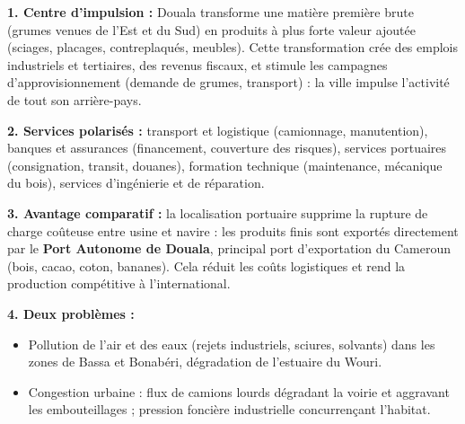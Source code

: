 \documentclass[11pt]{article}
\newcommand{\cle}[1]{{\popxbold\color{popdark}#1}}
\begin{document}
\begin{corrige}
\textbf{1. Centre d'impulsion :} Douala transforme une matière première brute (grumes venues de l'Est et du Sud) en produits à plus forte \cle{valeur ajoutée} (sciages, placages, contreplaqués, meubles). Cette transformation crée des emplois industriels et tertiaires, des revenus fiscaux, et stimule les campagnes d'approvisionnement (demande de grumes, transport) : la ville impulse l'activité de tout son arrière-pays.

\textbf{2. Services polarisés :} transport et logistique (camionnage, manutention), banques et assurances (financement, couverture des risques), services portuaires (consignation, transit, douanes), formation technique (maintenance, mécanique du bois), services d'ingénierie et de réparation.

\textbf{3. Avantage comparatif :} la localisation portuaire supprime la rupture de charge coûteuse entre usine et navire : les produits finis sont exportés directement par le \textbf{Port Autonome de Douala}, principal port d'exportation du Cameroun (bois, cacao, coton, bananes). Cela réduit les coûts logistiques et rend la production compétitive à l'international.

\textbf{4. Deux problèmes :}
\begin{itemize}
    \item Pollution de l'air et des eaux (rejets industriels, sciures, solvants) dans les zones de Bassa et Bonabéri, dégradation de l'estuaire du Wouri.
    \item Congestion urbaine : flux de camions lourds dégradant la voirie et aggravant les embouteillages ; pression foncière industrielle concurrençant l'habitat.
\end{itemize}
\end{corrige}
\end{document}
